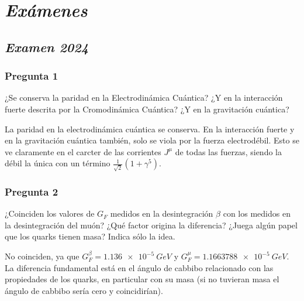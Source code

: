 
\newpage
\section*{\textit{Exámenes}}

\subsection*{\textit{Examen 2024}}

\begin{Enunciado}

	\subsubsection*{Pregunta 1}

	¿Se conserva la paridad en la Electrodinámica Cuántica? ¿Y en la interacción fuerte descrita por la Cromodinámica Cuántica? ¿Y en la gravitación cuántica?

\end{Enunciado}

La paridad en la electrodinámica cuántica se conserva. En la interacción fuerte y en la gravitación cuántica también, solo se viola por la fuerza electrodébil. Esto se ve claramente en el carcter de las corrientes $J^{\mu}$ de todas las fuerzas, siendo la débil la única con un término $\frac{1}{\sqrt{2}}(1+\gamma^5)$.


\vspace*{2em}

\begin{Enunciado}
	\subsubsection*{Pregunta 2}

	¿Coinciden los valores de $G_F$ medidos en la desintegración $\beta$ con los medidos en la desintegración del muón? ¿Qué factor origina la diferencia? ¿Juega algún papel que los quarks tienen masa? Indica sólo la idea.

\end{Enunciado}

No coinciden, ya que $G_F^\beta = \SI{1.136e-5}{GeV}$ y $G_F^\mu = \SI{1.1663788e-5}{GeV}$. La diferencia fundamental está en el ángulo de cabbibo relacionado con las propiedades de los quarks, en particular con su masa (si no tuvieran masa el ángulo de cabbibo sería cero y coincidirían).

\vspace*{2em}

